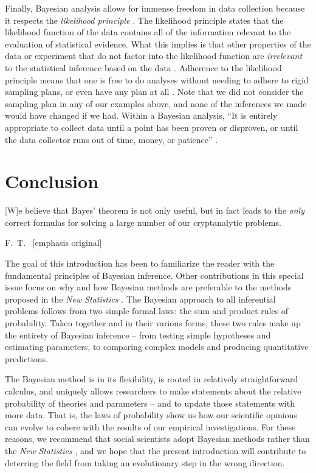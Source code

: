 Finally, Bayesian analysis allows for immense freedom in data collection because it respects the \textit{likelihood principle} {\cite{BergerWolpert1988}}. The likelihood principle states that the likelihood function of the data contains all of the information relevant to the evaluation of statistical evidence. What this implies is that other properties of the data or experiment that do not factor into the likelihood function are \textit{irrelevant} to the statistical inference based on the data \cite{Lindley1993,Royall1997}. 
Adherence to the likelihood principle means that one is free to do analyses without needing to adhere to rigid sampling plans, or even have any plan at all \cite{Rouder2014PBR}. Note that we did not consider the sampling plan in any of our examples above, and none of the inferences we made would have changed if we had. Within a Bayesian analysis, ``It is entirely appropriate to collect data until a point has been proven or disproven, or until the data collector runs out of time, money, or patience'' \cite[p.\ 193]{EdwardsEtAl1963}. 

\section{Conclusion}
\epigraph{[W]e believe that Bayes' theorem is not only useful, but in fact leads to the \emph{only} correct formulas for solving a large number of our cryptanalytic problems.}{F.~T.~ [emphasis original]}

The goal of this introduction has been to familiarize the reader with the fundamental principles of Bayesian inference. {Other contributions in this special issue \cite{DienesSI,KruschkeSI2} focus on why and how Bayesian methods are preferable to the methods proposed in the \textit{New Statistics} \cite{Cumming2014}.} The Bayesian approach to all inferential problems follows from two simple formal laws: the sum and product rules of probability. Taken together and in their various forms, these two rules make up the entirety of Bayesian inference -- from testing simple hypotheses and estimating parameters, to comparing complex models and producing quantitative predictions.

The Bayesian method is  in its flexibility, is rooted in relatively straightforward calculus, and uniquely allows researchers to make statements about the relative probability of theories and parameters -- and to update those statements with more data. That is, the laws of probability show us how our scientific opinions can evolve to cohere with the results of our empirical investigations. For these reasons, we recommend {that social scientists adopt}  Bayesian methods {rather than the \textit{New Statistics}} , and we hope that the present introduction will contribute to deterring the field from taking an evolutionary step in the wrong direction. 

